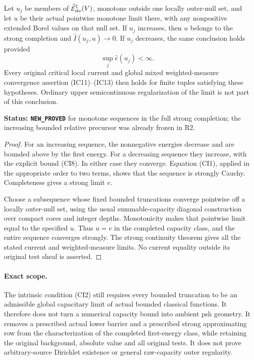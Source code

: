 \begin{corollary}
\label{cor:r11-strong-monotone-closure}
Let $u_j$ be members of
$\widehat{\mathcal E}^1_{\rm str}(V)$, monotone outside one
locally outer-null set, and let $u$ be their actual pointwise
monotone limit there, with any nonpositive extended Borel values
on that null set.
If $u_j$ increases, then $u$ belongs to the strong completion
and $\widehat I(u_j,u)\to0$.
If $u_j$ decreases, the same conclusion holds provided
\[
                            \sup_j\widehat e(u_j)<\infty.
 \tag{CI8}
\]
Every original critical local current and global mixed
weighted-measure convergence assertion (IC11)--(IC13)
then holds for finite tuples satisfying these hypotheses.
Ordinary upper semicontinuous regularization of the limit
is not part of this conclusion.
\end{corollary}

\noindent\textbf{Status: \texttt{NEW\_PROVED}} for monotone
sequences in the full strong completion; the increasing
bounded relative precursor was already frozen in R2.

\begin{proof}
For an increasing sequence, the nonnegative energies decrease
and are bounded above by the first energy. For a decreasing
sequence they increase, with the explicit bound (CI8).
In either case they converge. Equation (CI1), applied in
the appropriate order to two terms, shows that the sequence
is strongly Cauchy. Completeness gives a strong limit $v$.

Choose a subsequence whose fixed bounded truncations converge
pointwise off a locally outer-null set, using the usual
summable-capacity diagonal construction over compact cores
and integer depths. Monotonicity makes that pointwise limit
equal to the specified $u$. Thus $u=v$ in the completed
capacity class, and the entire sequence converges strongly.
The strong continuity theorem gives all the stated current
and weighted-measure limits. No current equality outside its
original test sheaf is asserted.
\end{proof}

\paragraph{Exact scope.}
The intrinsic condition (CI2) still requires every bounded
truncation to be an admissible global capacitary limit of
actual bounded classical functions. It therefore does not
turn a numerical capacity bound into ambient psh geometry.
It removes a prescribed actual lower barrier and a prescribed
strong approximating row from the characterization of the
completed first-energy class, while retaining the original
background, absolute value and all original tests. It does
not prove arbitrary-source Dirichlet existence or general
raw-capacity outer regularity.
